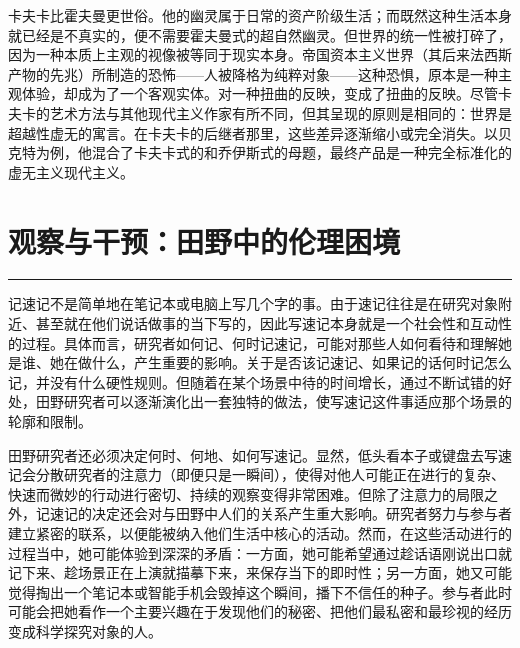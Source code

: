 \documentclass[12pt,a4paper]{article}
\begin{document}
卡夫卡比霍夫曼更世俗。他的幽灵属于日常的资产阶级生活；而既然这种生活本身就已经是不真实的，便不需要霍夫曼式的超自然幽灵。但世界的统一性被打碎了，因为一种本质上主观的视像被等同于现实本身。帝国资本主义世界（其后来法西斯产物的先兆）所制造的恐怖——人被降格为纯粹对象——这种恐惧，原本是一种主观体验，却成为了一个客观实体。对一种扭曲的反映，变成了扭曲的反映。尽管卡夫卡的艺术方法与其他现代主义作家有所不同，但其呈现的原则是相同的：世界是超越性虚无的寓言。在卡夫卡的后继者那里，这些差异逐渐缩小或完全消失。以贝克特为例，他混合了卡夫卡式的和乔伊斯式的母题，最终产品是一种完全标准化的虚无主义现代主义。
\par{}
\newpage
\section{观察与干预：田野中的伦理困境}
\vspace{0.5em}
\vspace{0.3em}

\noindent\rule{\textwidth}{0.4pt}

\vspace{0.3em}



记速记不是简单地在笔记本或电脑上写几个字的事。由于速记往往是在研究对象附近、甚至就在他们说话做事的当下写的，因此写速记本身就是一个社会性和互动性的过程。具体而言，研究者如何记、何时记速记，可能对那些人如何看待和理解她是谁、她在做什么，产生重要的影响。关于是否该记速记、如果记的话何时记怎么记，并没有什么硬性规则。但随着在某个场景中待的时间增长，通过不断试错的好处，田野研究者可以逐渐演化出一套独特的做法，使写速记这件事适应那个场景的轮廓和限制。



\vspace{0.2em}



田野研究者还必须决定何时、何地、如何写速记。显然，低头看本子或键盘去写速记会分散研究者的注意力（即便只是一瞬间），使得对他人可能正在进行的复杂、快速而微妙的行动进行密切、持续的观察变得非常困难。但除了注意力的局限之外，记速记的决定还会对与田野中人们的关系产生重大影响。研究者努力与参与者建立紧密的联系，以便能被纳入他们生活中核心的活动。然而，在这些活动进行的过程当中，她可能体验到深深的矛盾：一方面，她可能希望通过趁话语刚说出口就记下来、趁场景正在上演就描摹下来，来保存当下的即时性；另一方面，她又可能觉得掏出一个笔记本或智能手机会毁掉这个瞬间，播下不信任的种子。参与者此时可能会把她看作一个主要兴趣在于发现他们的秘密、把他们最私密和最珍视的经历变成科学探究对象的人。
\end{document}
